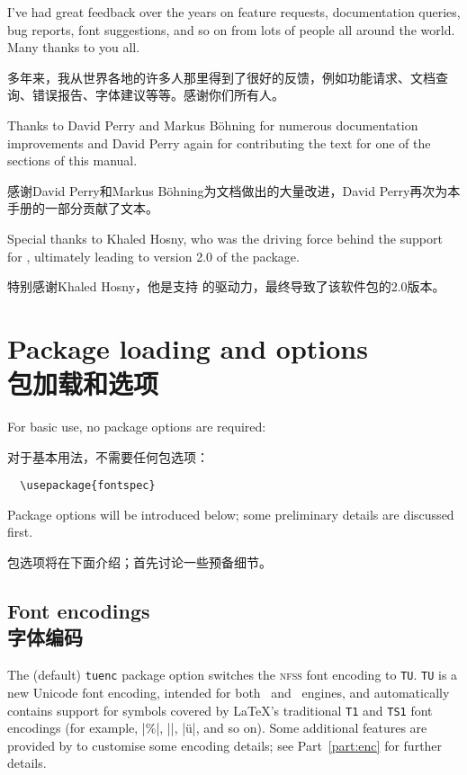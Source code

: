 \documentclass[a4paper]{l3doc}
\begin{document}
I've had great
feedback over the years on feature requests, documentation queries, bug reports, font suggestions, and so on from lots of people all around the world.
Many thanks to you all.

多年来，我从世界各地的许多人那里得到了很好的反馈，例如功能请求、文档查询、错误报告、字体建议等等。感谢你们所有人。

Thanks to David Perry and Markus B\"ohning for numerous documentation
improvements and David Perry again for contributing the text for one of the
sections of this manual.

感谢David Perry和Markus B\"ohning为文档做出的大量改进，David Perry再次为本手册的一部分贡献了文本。

Special thanks to Khaled Hosny, who was the driving force behind the support for \LuaLaTeX, ultimately leading to version 2.0 of the package.

特别感谢Khaled Hosny，他是支持 \LuaLaTeX 的驱动力，最终导致了该软件包的2.0版本。


\section{Package loading and options\\包加载和选项}

For basic use, no package options are required:

对于基本用法，不需要任何包选项：
\begin{Verbatim}
  \usepackage{fontspec}
\end{Verbatim}
Package options will be introduced below; some preliminary details are discussed first.

包选项将在下面介绍；首先讨论一些预备细节。

\subsection{Font encodings\\字体编码}

The (default) \texttt{tuenc} package option switches the \textsc{nfss} font encoding to \texttt{TU}.
\texttt{TU} is a new Unicode font encoding, intended for both \XeTeX\ and \LuaTeX\ engines, and automatically contains support for symbols covered by \LaTeX's traditional \texttt{T1} and \texttt{TS1} font encodings (for example, |\%|, |\textbullet|, |\"u|, and so on).
Some additional features are provided by  to customise some encoding details; see Part~\vref{part:enc} for further details.
\end{document}
